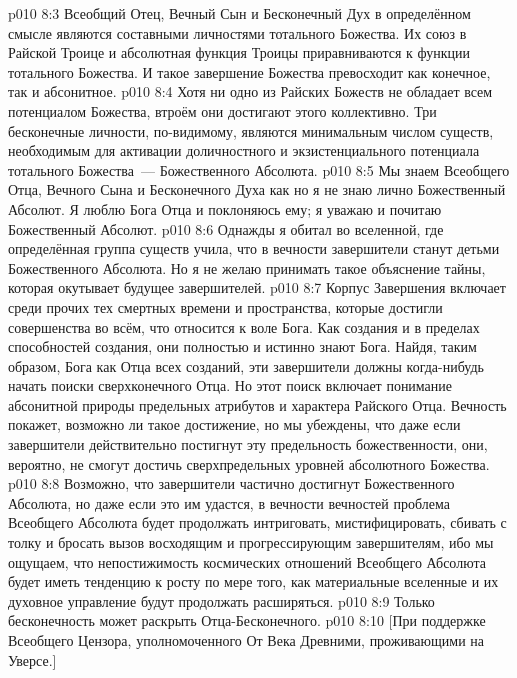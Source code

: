 \vs p010 8:3 \pc Всеобщий Отец, Вечный Сын и Бесконечный Дух в определённом смысле являются составными личностями тотального Божества. Их союз в Райской Троице и абсолютная функция Троицы приравниваются к функции тотального Божества. И такое завершение Божества превосходит как конечное, так и абсонитное.
\vs p010 8:4 Хотя ни одно из Райских Божеств не обладает всем потенциалом Божества, втроём они достигают этого коллективно. Три бесконечные личности, по\hyp{}видимому, являются минимальным числом существ, необходимым для активации доличностного и экзистенциального потенциала тотального Божества~--- Божественного Абсолюта.
\vs p010 8:5 Мы знаем Всеобщего Отца, Вечного Сына и Бесконечного Духа как  но я не знаю лично Божественный Абсолют. Я люблю Бога Отца и поклоняюсь ему; я уважаю и почитаю Божественный Абсолют.
\vs p010 8:6 \pc Однажды я обитал во вселенной, где определённая группа существ учила, что в вечности завершители станут детьми Божественного Абсолюта. Но я не желаю принимать такое объяснение тайны, которая окутывает будущее завершителей.
\vs p010 8:7 Корпус Завершения включает среди прочих тех смертных времени и пространства, которые достигли совершенства во всём, что относится к воле Бога. Как создания и в пределах способностей создания, они полностью и истинно знают Бога. Найдя, таким образом, Бога как Отца всех созданий, эти завершители должны когда\hyp{}нибудь начать поиски сверхконечного Отца. Но этот поиск включает понимание абсонитной природы предельных атрибутов и характера Райского Отца. Вечность покажет, возможно ли такое достижение, но мы убеждены, что даже если завершители действительно постигнут эту предельность божественности, они, вероятно, не смогут достичь сверхпредельных уровней абсолютного Божества.
\vs p010 8:8 Возможно, что завершители частично достигнут Божественного Абсолюта, но даже если это им удастся, в вечности вечностей проблема Всеобщего Абсолюта будет продолжать интриговать, мистифицировать, сбивать с толку и бросать вызов восходящим и прогрессирующим завершителям, ибо мы ощущаем, что непостижимость космических отношений Всеобщего Абсолюта будет иметь тенденцию к росту по мере того, как материальные вселенные и их духовное управление будут продолжать расширяться.
\vs p010 8:9 \pc Только бесконечность может раскрыть Отца\hyp{}Бесконечного.
\vsetoff
\vs p010 8:10 [При поддержке Всеобщего Цензора, уполномоченного От Века Древними, проживающими на Уверсе.]
\quizlink
